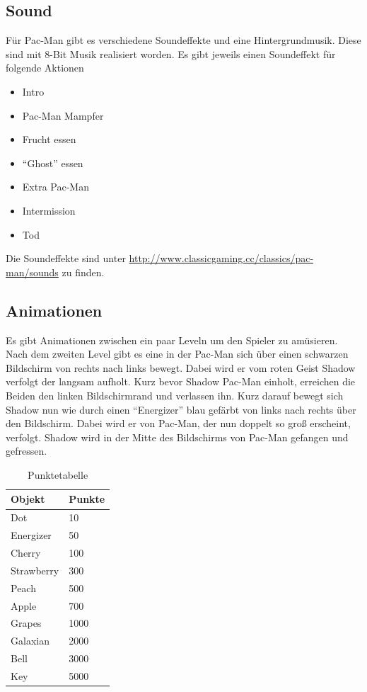 \documentclass[a4paper, 11pt]{article}
\begin{document}
\subsection{Sound\cite{SoundPacMan}}
Für Pac-Man gibt es verschiedene Soundeffekte und eine Hintergrundmusik. Diese sind mit 8-Bit Musik realisiert worden. Es gibt jeweils einen Soundeffekt für folgende Aktionen

\begin{itemize}
\item Intro
\item Pac-Man Mampfer
\item Frucht essen
\item "`Ghost"' essen
\item Extra Pac-Man
\item Intermission
\item Tod
\end{itemize}

Die Soundeffekte sind unter \url{http://www.classicgaming.cc/classics/pac-man/sounds} zu finden.

\subsection{Animationen}
Es gibt Animationen zwischen ein paar Leveln um den Spieler zu amüsieren. Nach dem zweiten Level gibt es eine in der Pac-Man sich über einen schwarzen Bildschirm von rechts nach links bewegt. Dabei wird er vom roten Geist Shadow verfolgt der langsam aufholt. Kurz bevor Shadow Pac-Man einholt, erreichen die Beiden den linken Bildschirmrand und verlassen ihn. Kurz darauf bewegt sich Shadow nun wie durch einen "`Energizer"' blau gefärbt von links nach rechts über den Bildschirm. Dabei wird er von Pac-Man, der nun doppelt so groß erscheint, verfolgt. Shadow wird in der Mitte des Bildschirms von Pac-Man gefangen und gefressen. 

\begin{table}[ht!]
	\centering
	\begin{tabular}{|l|l|}
	\hline
	Objekt & Punkte \\ \hline 
	\hline
	Dot	& 10  \\ \hline
	Energizer & 50 \\ \hline
	Cherry & 100 \\ \hline
	Strawberry	& 300 \\ \hline
	Peach & 500 \\ \hline
	Apple & 700 \\ \hline
	Grapes & 1000 \\ \hline
	Galaxian & 2000 \\ \hline
	Bell & 3000 \\ \hline
	Key & 5000 \\ \hline
	
	\end{tabular}
	\caption{Punktetabelle}
	\label{table1}
\end{table}
\end{document}
